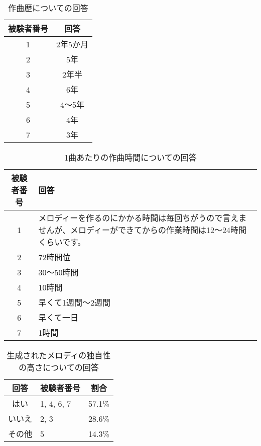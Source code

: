 \begin{table}[htbp]
  \begin{center}
    \caption{作曲歴についての回答}
    \begin{tabular}{cc}
      \hline
      被験者番号 & 回答 \\ \hline \hline
      1 & 2年5か月\rule[-3mm]{0mm}{8mm} \\ \hline
      2 & 5年\rule[-3mm]{0mm}{8mm} \\ \hline
      3 & 2年半\rule[-3mm]{0mm}{8mm} \\ \hline
      4 & 6年\rule[-3mm]{0mm}{8mm} \\ \hline
      5 & 4〜5年\rule[-3mm]{0mm}{8mm} \\ \hline
      6 & 4年\rule[-3mm]{0mm}{8mm} \\ \hline
      7 & 3年\rule[-3mm]{0mm}{8mm} \\ \hline
    \end{tabular}
  \end{center}
\end{table}

\begin{table}[htbp]
  \begin{center}
    \caption{1曲あたりの作曲時間についての回答}
    \begin{tabular}{cp{30em}}
      \hline
      被験者番号 & 回答\rule[-3mm]{0mm}{8mm} \\ \hline \hline
      1 & メロディーを作るのにかかる時間は毎回ちがうので言えませんが、メロディーができてからの作業時間は12～24時間くらいです。\rule[-3mm]{0mm}{8mm} \\ \hline
      2 & 72時間位\rule[-3mm]{0mm}{8mm} \\ \hline
      3 & 30〜50時間\rule[-3mm]{0mm}{8mm} \\ \hline
      4 & 10時間\rule[-3mm]{0mm}{8mm} \\ \hline
      5 & 早くて1週間〜2週間\rule[-3mm]{0mm}{8mm} \\ \hline
      6 & 早くて一日\rule[-3mm]{0mm}{8mm} \\ \hline
      7 & 1時間\rule[-3mm]{0mm}{8mm} \\ \hline
    \end{tabular}
  \end{center}
\end{table}

\begin{table}[htbp]
  \begin{center}
    \caption{生成されたメロディの独自性の高さについての回答}
    \begin{tabular}{|c|p{10em}|c|}
      \hline
      回答 & 被験者番号 & 割合\rule[-3mm]{0mm}{8mm} \\ \hline \hline
      はい & 1, 4, 6, 7 & 57.1\% \rule[-3mm]{0mm}{8mm} \\ \hline
      いいえ & 2, 3 & 28.6\% \rule[-3mm]{0mm}{8mm} \\ \hline
      その他 & 5 & 14.3\% \rule[-3mm]{0mm}{8mm} \\ \hline
    \end{tabular}
  \end{center}
\end{table}

